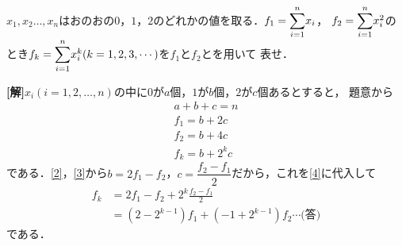 \documentclass[a4j]{jarticle}
\title{}
\begin{document}

\begin{oframed}
$x_1,x_2\dots,x_n$はおのおの$0$，$1$，$2$のどれかの値を取る．$f_1={\displaystyle\sum_{i=1}^{n}}x_i$，
$f_2={\displaystyle\sum_{i=1}^{n}}x_i^2$のとき$f_k={\displaystyle\sum_{i=1}^{n}}x_i^k(k=1,2,3,\cdots)$を$f_1$と$f_2$とを用いて
表せ．
\end{oframed}

\setlength{\columnseprule}{0.4pt}
\begin{multicols}{2}
{\bf[解]}$x_i(i=1,2,\dots,n)$の中に$0$が$a$個，$1$が$b$個，$2$が$c$個あるとすると，
題意から
     \begin{align}
     a+b+c=n \\
     f_1=b+2c \label{2}\\
     f_2=b+4c  \label{3}\\
     f_k=b+2^kc \label{4}
     \end{align}
である．\eqref{2}，\eqref{3}から$b=2f_1-f_2$，$c=\dfrac{f_2-f_1}{2}$だから，これを\eqref{4}に代入して
     \begin{align*}
     f_k&=2f_1-f_2+2^k\frac{f_2-f_1}{2} \\
     &=(2-2^{k-1})f_1+(-1+2^{k-1})f_2\cdots\text{(答)}
     \end{align*}
である．         
\newpage
\end{multicols}
\end{document}
